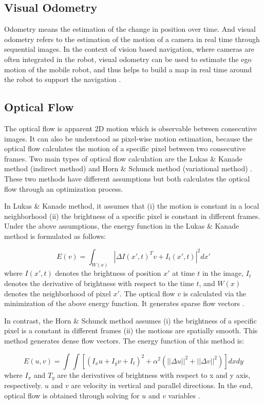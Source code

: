 \documentclass[11pt]{easychair}
\begin{document}
\subsection{Visual Odometry}
Odometry means the estimation of the change in position over time. And visual odometry refers to the estimation of the motion of a camera in real time through sequential images. In the context of vision based navigation, where cameras are often integrated in the robot, visual odometry can be used to estimate the ego motion of the mobile robot, and thus helps to build a map in real time around the robot to support the navigation \cite{vo}.

\subsection{Optical Flow} The optical flow is apparent 2D motion which is observable between consecutive images. It can also be understood as pixel-wise motion estimation, because the optical flow calculates the motion of a specific pixel between two consecutive frames. Two main types of optical flow calculation are the Lukas \& Kanade method (indirect method) and Horn \& Schunck method (variational method) \cite{lukas} \cite{horn}. These two methods have different assumptions but both calculates the optical flow through an optimization process.

In Lukas \& Kanade method, it assumes that (i) the motion is constant in a local neighborhood (ii) the brightness of a specific pixel is constant in different frames. Under the above assumptions, the energy function in the Lukas \& Kanade method is formulated as follows:

\begin{equation}
E(v) = \int_{W(x)} |\Delta I(x', t)^Tv + I_t(x',t) |^2dx'
\end{equation}
\noindent
where $I(x',t)$ denotes the brightness of position $x'$ at time $t$ in the image, $I_t$ denotes the derivative of brightness with respect to the time $t$, and $W(x)$ denotes the neighborhood of pixel $x'$. The optical flow $v$ is calculated via the minimization of the above energy function. It generates sparse flow vectors \cite{lukas}.

In contrast, the Horn \& Schunck method assumes (i) the brightness of a specific pixel is a constant in different frames (ii) the motions are spatially smooth. This method generates dense flow vectors. The energy function of this method is:

\begin{equation}
E(u,v) = \int\int[(I_xu + I_yv + I_t)^2+\alpha^2(||\Delta u ||^2 + ||\Delta v ||^2)]dxdy
\end{equation} 
\noindent
where $I_x$ and $T_y$ are the derivatives of brightness with respect to x and y axis, respectively. $u$ and $v$ are velocity in vertical and parallel directions. In the end, optical flow is obtained through solving for $u$ and $v$ variables \cite{horn}.		
\end{document}
